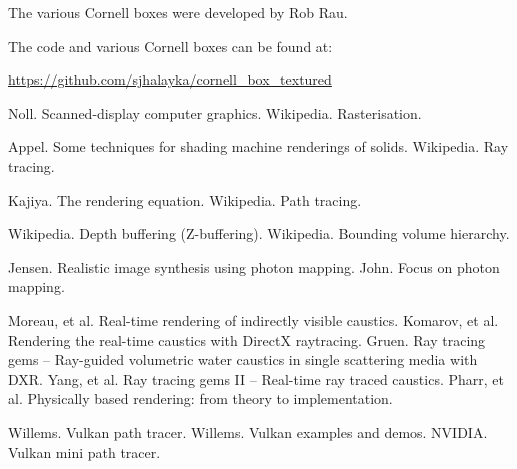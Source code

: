 \documentclass[12pt]{article}
\begin{document}
The various Cornell boxes were developed by Rob Rau.

The code and various Cornell boxes can be found at: 

\url{https://github.com/sjhalayka/cornell_box_textured}






\begin{thebibliography}{9}

 Noll. Scanned-display computer graphics.
 Wikipedia. Rasterisation.

 Appel. Some techniques for shading machine renderings of solids.
 Wikipedia. Ray tracing.

 Kajiya. The rendering equation.
 Wikipedia. Path tracing.

 Wikipedia. Depth buffering (Z-buffering).
 Wikipedia. Bounding volume hierarchy.


 Jensen. Realistic image synthesis using photon mapping.
 John. Focus on photon mapping.


 Moreau, et al. Real-time rendering of indirectly visible caustics.
 Komarov, et al. Rendering the real-time caustics with DirectX raytracing.
 Gruen. Ray tracing gems -- Ray-guided volumetric water caustics in single scattering media with DXR.
 Yang, et al. Ray tracing gems II -- Real-time ray traced caustics.
 Pharr, et al. Physically based rendering: from theory to implementation.



 Willems. Vulkan path tracer.
 Willems. Vulkan examples and demos.
 NVIDIA. Vulkan mini path tracer.



\end{thebibliography}


\pagebreak
\end{document}

